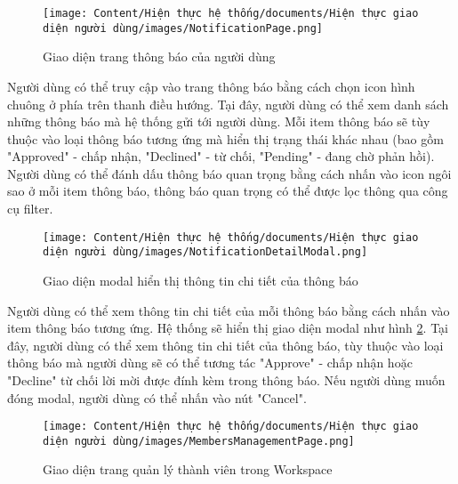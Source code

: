 \begin{figure}[H]
    \centering
    \texttt{[image: Content/Hiện thực hệ thống/documents/Hiện thực giao diện người dùng/images/NotificationPage.png]}
    \vspace{0.5cm}
    \caption{Giao diện trang thông báo của người dùng}
    \label{fig: Giao diện trang thông báo của người dùng}
\end{figure}

Người dùng có thể truy cập vào trang thông báo bằng cách chọn icon hình chuông ở phía trên thanh điều hướng. Tại đây, người dùng có thể xem danh sách những thông báo mà hệ thống gửi tới người dùng. Mỗi item thông báo sẽ tùy thuộc vào loại thông báo tương ứng mà hiển thị trạng thái khác nhau (bao gồm "Approved" - chấp nhận, "Declined" - từ chối, "Pending" - đang chờ phản hồi). Người dùng có thể đánh dấu thông báo quan trọng bằng cách nhấn vào icon ngôi sao ở mỗi item thông báo, thông báo quan trọng có thể được lọc thông qua công cụ filter.

\begin{figure}[H]
    \centering
    \texttt{[image: Content/Hiện thực hệ thống/documents/Hiện thực giao diện người dùng/images/NotificationDetailModal.png]}
    \vspace{0.5cm}
    \caption{Giao diện modal hiển thị thông tin chi tiết của thông báo}
    \label{fig: Giao diện modal hiển thị thông tin chi tiết của thông báo}
\end{figure}

Người dùng có thể xem thông tin chi tiết của mỗi thông báo bằng cách nhấn vào item thông báo tương ứng. Hệ thống sẽ hiển thị giao diện modal như hình \ref{fig: Giao diện modal hiển thị thông tin chi tiết của thông báo}. Tại đây, người dùng có thể xem thông tin chi tiết của thông báo, tùy thuộc vào loại thông báo mà người dùng sẽ có thể tương tác "Approve" - chấp nhận hoặc "Decline" từ chối lời mời được đính kèm trong thông báo. Nếu người dùng muốn đóng modal, người dùng có thể nhấn vào nút "Cancel".

\begin{figure}[H]
    \centering
    \texttt{[image: Content/Hiện thực hệ thống/documents/Hiện thực giao diện người dùng/images/MembersManagementPage.png]}
    \vspace{0.5cm}
    \caption{Giao diện trang quản lý thành viên trong Workspace}
    \label{fig: Giao diện trang quản lý thành viên trong Workspace}
\end{figure}

